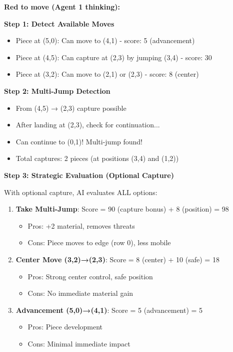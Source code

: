 \documentclass[12pt,a4paper]{article}
\begin{document}
\textbf{Red to move (Agent 1 thinking):}

\textbf{Step 1: Detect Available Moves}
\begin{itemize}
    \item Piece at (5,0): Can move to (4,1) - score: 5 (advancement)
    \item Piece at (4,5): Can capture at (2,3) by jumping (3,4) - score: 30
    \item Piece at (3,2): Can move to (2,1) or (2,3) - score: 8 (center)
\end{itemize}

\textbf{Step 2: Multi-Jump Detection}
\begin{itemize}
    \item From (4,5) → (2,3) capture possible
    \item After landing at (2,3), check for continuation...
    \item Can continue to (0,1)! Multi-jump found!
    \item Total captures: 2 pieces (at positions (3,4) and (1,2))
\end{itemize}

\textbf{Step 3: Strategic Evaluation (Optional Capture)}

With optional capture, AI evaluates ALL options:
\begin{enumerate}
    \item \textbf{Take Multi-Jump}: Score = 90 (capture bonus) + 8 (position) = 98
    \begin{itemize}
        \item Pros: +2 material, removes threats
        \item Cons: Piece moves to edge (row 0), less mobile
    \end{itemize}
    
    \item \textbf{Center Move (3,2)→(2,3)}: Score = 8 (center) + 10 (safe) = 18
    \begin{itemize}
        \item Pros: Strong center control, safe position
        \item Cons: No immediate material gain
    \end{itemize}
    
    \item \textbf{Advancement (5,0)→(4,1)}: Score = 5 (advancement) = 5
    \begin{itemize}
        \item Pros: Piece development
        \item Cons: Minimal immediate impact
    \end{itemize}
\end{enumerate}
\end{document}
